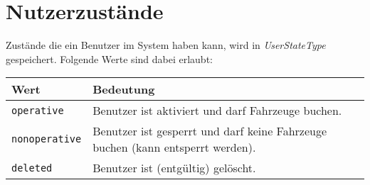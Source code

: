 \section{Nutzerzustände}
\label{sec:CodeTabellen:UserStateType}

Zustände die ein Benutzer im System haben kann, wird in  \emph{UserStateType} gespeichert. Folgende Werte sind dabei erlaubt:

\begin{flushleft}
\begin{tabularx}{\linewidth}{l>{\raggedright\arraybackslash}X}
\toprule
Wert & Bedeutung\\
\midrule
\verb|operative| & Benutzer ist aktiviert und darf Fahrzeuge buchen.\\
\verb|nonoperative| & Benutzer ist gesperrt und darf keine Fahrzeuge buchen (kann entsperrt werden).\\
\verb|deleted| & Benutzer ist (entgültig) gelöscht.\\
\bottomrule
\end{tabularx}
\end{flushleft}
